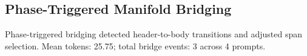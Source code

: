 \subsection{Phase-Triggered Manifold Bridging}
Phase-triggered bridging detected header-to-body transitions and adjusted span selection.
Mean tokens: 25.75; total bridge events: 3 across 4 prompts.
